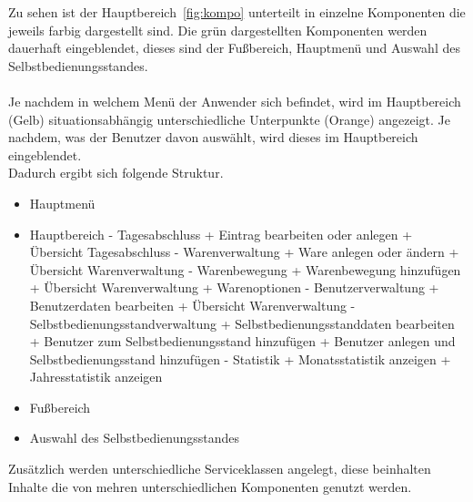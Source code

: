 Zu sehen ist der Hauptbereich~\ref{fig:kompo} unterteilt in einzelne Komponenten die jeweils farbig dargestellt sind. Die grün dargestellten Komponenten werden dauerhaft eingeblendet, dieses sind der Fußbereich, Hauptmenü und Auswahl des Selbstbedienungsstandes. 
\\
\\
Je nachdem in welchem Menü der Anwender sich befindet, wird im Hauptbereich (Gelb) situationsabhängig unterschiedliche Unterpunkte (Orange) angezeigt. Je nachdem, was der Benutzer davon auswählt, wird dieses im Hauptbereich eingeblendet.
\\
Dadurch ergibt sich folgende Struktur.
\begin{itemize}
	\itemsep0pt
	\item Hauptmenü
	\item Hauptbereich
		\subitem - Tagesabschluss 
			\subsubitem + Eintrag bearbeiten oder anlegen
			\subsubitem + Übersicht Tagesabschluss
		\subitem - Warenverwaltung 
			\subsubitem + Ware anlegen oder ändern
			\subsubitem + Übersicht Warenverwaltung
		\subitem - Warenbewegung 
			\subsubitem + Warenbewegung hinzufügen
			\subsubitem + Übersicht Warenverwaltung
			\subsubitem + Warenoptionen
		\subitem - Benutzerverwaltung 
			\subsubitem + Benutzerdaten bearbeiten
			\subsubitem + Übersicht Warenverwaltung
		\subitem - Selbstbedienungsstandverwaltung 
				\subsubitem + Selbstbedienungsstanddaten bearbeiten
				\subsubitem + Benutzer zum Selbstbedienungsstand hinzufügen
				\subsubitem + Benutzer anlegen und Selbstbedienungsstand hinzufügen
		\subitem - Statistik 
				\subsubitem + Monatsstatistik anzeigen
				\subsubitem + Jahresstatistik anzeigen
	\item Fußbereich
	\item Auswahl des Selbstbedienungsstandes
	
\end{itemize}


Zusätzlich werden unterschiedliche Serviceklassen angelegt, diese beinhalten Inhalte die von mehren unterschiedlichen Komponenten genutzt werden. 


